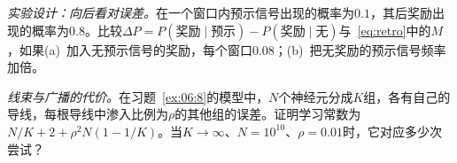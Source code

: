 \begin{exercise}[\lvlB]
\label{ex:07:7}
\emph{实验设计：向后看对误差。}在一个窗口内预示信号出现的概率为$0.1$，其后奖励出现的概率为$0.8$。比较$\Delta P=P(\text{奖励}\mid\text{预示})-P(\text{奖励}\mid\text{无})$与~\eqref{eq:retro}中的$M$，如果(a)~加入无预示信号的奖励，每个窗口$0.08$；(b)~把无奖励的预示信号频率加倍。
\end{exercise}

\begin{exercise}[\lvlC]
\label{ex:07:8}
\emph{线束与广播的代价。}在习题~\ref{ex:06:8}的模型中，$N$个神经元分成$K$组，各有自己的导线，每根导线中渗入比例为$\rho$的其他组的误差。证明学习常数为$N/K+2+\rho^2N(1-1/K)$。当$K\to\infty$、$N=10^{10}$、$\rho=0.01$时，它对应多少次尝试？
\end{exercise}
